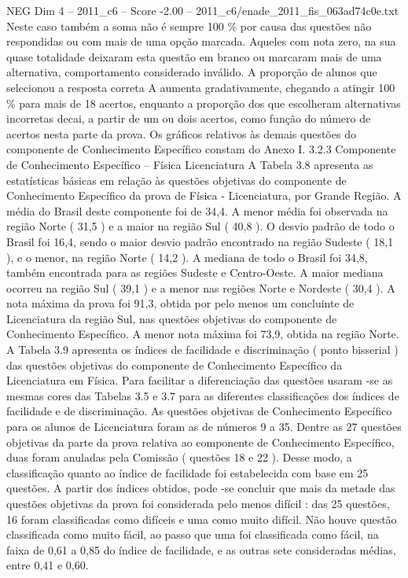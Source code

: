 \begin{textsample}{NEG Dim 4 – 2011\_c6 – Score -2.00 – 2011\_c6/enade\_2011\_fis\_063ad74c0e.txt}
Neste caso também a soma não é sempre 100 \% por causa das questões não respondidas ou com mais de uma opção marcada.
Aqueles com nota zero, na sua quase totalidade deixaram esta questão em branco ou marcaram mais de uma alternativa, comportamento considerado inválido.
A proporção de alunos que selecionou a resposta correta A aumenta gradativamente, chegando a atingir 100 \% para mais de 18 acertos, enquanto a proporção dos que escolheram alternativas incorretas decai, a partir de um ou dois acertos, como função do número de acertos nesta parte da prova.
Os gráficos relativos às demais questões do componente de Conhecimento Específico constam do Anexo I. 3.2.3 Componente de Conhecimento Específico – Física Licenciatura A Tabela 3.8 apresenta as estatísticas básicas em relação às questões objetivas do componente de Conhecimento Específico da prova de Física - Licenciatura, por Grande Região.
A média do Brasil deste componente foi de 34,4.
A menor média foi observada na região Norte ( 31,5 ) e a maior na região Sul ( 40,8 ).
O desvio padrão de todo o Brasil foi 16,4, sendo o maior desvio padrão encontrado na região Sudeste ( 18,1 ), e o menor, na região Norte ( 14,2 ).
A mediana de todo o Brasil foi 34,8, também encontrada para as regiões Sudeste e Centro-Oeste.
A maior mediana ocorreu na região Sul ( 39,1 ) e a menor nas regiões Norte e Nordeste ( 30,4 ).
A nota máxima da prova foi 91,3, obtida por pelo menos um concluinte de Licenciatura da região Sul, nas questões objetivas do componente de Conhecimento Específico.
A menor nota máxima foi 73,9, obtida na região Norte.
A Tabela 3.9 apresenta os índices de facilidade e discriminação ( ponto bisserial ) das questões objetivas do componente de Conhecimento Específico da Licenciatura em Física.
Para facilitar a diferenciação das questões usaram -se as mesmas cores das Tabelas 3.5 e 3.7 para as diferentes classificações dos índices de facilidade e de discriminação.
As questões objetivas de Conhecimento Específico para os alunos de Licenciatura foram as de números 9 a 35.
Dentre as 27 questões objetivas da parte da prova relativa ao componente de Conhecimento Específico, duas foram anuladas pela Comissão ( questões 18 e 22 ).
Desse modo, a classificação quanto ao índice de facilidade foi estabelecida com base em 25 questões.
A partir dos índices obtidos, pode -se concluir que mais da metade das questões objetivas da prova foi considerada pelo menos difícil : das 25 questões, 16 foram classificadas como difíceis e uma como muito difícil.
Não houve questão classificada como muito fácil, ao passo que uma foi classificada como fácil, na faixa de 0,61 a 0,85 do índice de facilidade, e as outras sete consideradas médias, entre 0,41 e 0,60.

\end{textsample}
